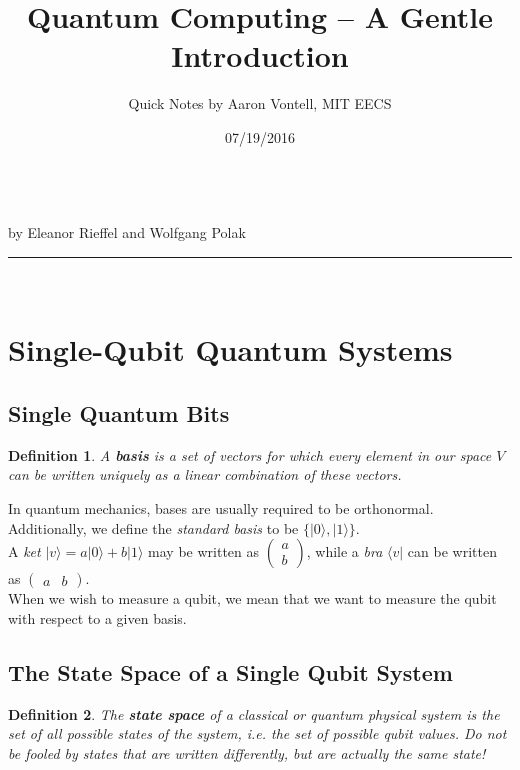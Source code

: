 \documentclass[12pt]{article}
\makeatletter
\newcommand{\linia}{\rule{\linewidth}{0.5pt}}
\theoremstyle{mytheor}
\newtheorem{defi}{Definition}
\renewcommand{\maketitle}{
\begin{center}
\vspace{2ex}
{\huge \textsc{\@title}}
\vspace{1ex}
\\
by Eleanor Rieffel and Wolfgang Polak\\
\linia\\
\@author \hfill \@date
\vspace{4ex}
\end{center}
}
\makeatother
\begin{document}
\title{Quantum Computing -- A Gentle Introduction}

\author{Quick Notes by Aaron Vontell, MIT EECS}

\date{07/19/2016}

\maketitle

\section{Single-Qubit Quantum Systems}

\subsection{Single Quantum Bits}

\begin{defi}
A \textbf{basis} is a set of vectors for which every element in our space $V$ can be written \textit{uniquely} as a linear combination of these vectors.
\end{defi}
In quantum mechanics, bases are usually required to be orthonormal. Additionally, we define the \textit{standard basis} to be \(\{|0\rangle, |1\rangle\}\).
\\A \textit{ket} \(|v\rangle = a|0\rangle + b|1\rangle\) may be written as $\begin{pmatrix}a\\ b\end{pmatrix}$, while a \textit{bra} \(\langle v|\) can be written as $\begin{pmatrix}a & b\end{pmatrix}$.
\\When we wish to measure a qubit, we mean that we want to measure the qubit with respect to a given basis.
\\
\subsection{The State Space of a Single Qubit System}

\begin{defi}
The \textbf{state space} of a classical or quantum physical system is the set of all possible states of the system, i.e. the set of possible qubit values. Do not be fooled by states that are written differently, but are actually the same state!
\end{defi}
\end{document}
